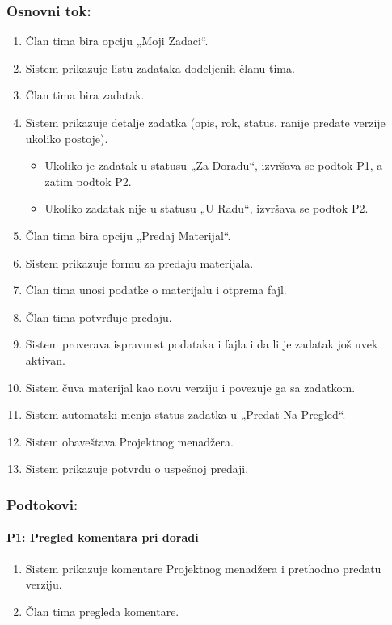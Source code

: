 \subsubsection*{Osnovni tok:}
\begin{enumerate}
	\item Član tima bira opciju „Moji Zadaci“.
	\item Sistem prikazuje listu zadataka dodeljenih članu tima.
	\item Član tima bira zadatak.
	\item Sistem prikazuje detalje zadatka (opis, rok, status, ranije predate verzije ukoliko postoje).
	\begin{itemize}
		\item Ukoliko je zadatak u statusu „Za Doradu“, izvršava se podtok P1, a zatim podtok P2.
		\item Ukoliko zadatak nije u statusu „U Radu“, izvršava se podtok P2.
	\end{itemize}
	\item Član tima bira opciju „Predaj Materijal“.
	\item Sistem prikazuje formu za predaju materijala.
	\item Član tima unosi podatke o materijalu i otprema fajl.
	\item Član tima potvrđuje predaju.
	\item Sistem proverava ispravnost podataka i fajla i da li je zadatak još uvek aktivan.
	\item Sistem čuva materijal kao novu verziju i povezuje ga sa zadatkom.
	\item Sistem automatski menja status zadatka u „Predat Na Pregled“.
	\item Sistem obaveštava Projektnog menadžera.
	\item Sistem prikazuje potvrdu o uspešnoj predaji.
\end{enumerate}

\subsubsection*{Podtokovi:}

\paragraph*{P1: Pregled komentara pri doradi}
\begin{enumerate}
	\item Sistem prikazuje komentare Projektnog menadžera i prethodno predatu verziju.
	\item Član tima pregleda komentare.
\end{enumerate}

